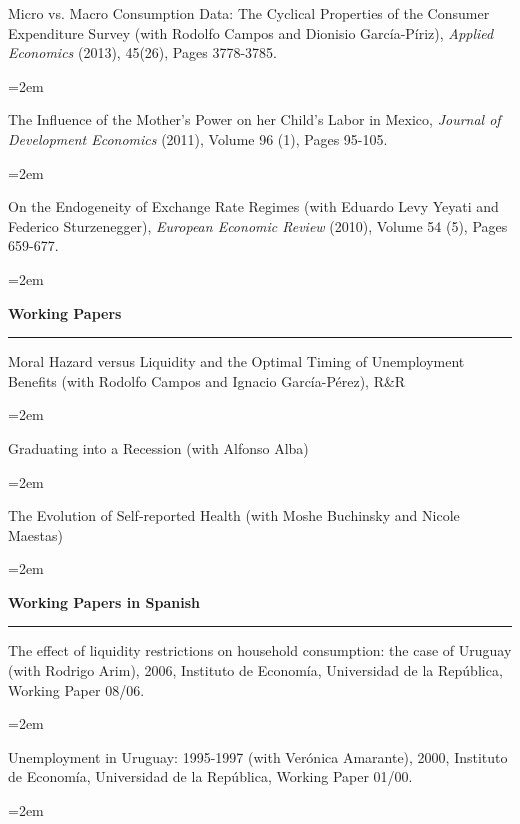 \documentclass[12pt]{article}
\newcommand{\sepspace}{\vspace*{1em}}		%
\newcommand{\NewPart}[1]{ \vspace*{0.4cm} \noindent \large \textbf{#1}
\par \normalsize \normalfont \vspace*{-0.5cm} \noindent\rule{\textwidth}{1.8pt} \vspace*{-0.75cm} }
\newcommand{\EducationEntry}[4]{
		\noindent #1 \hfill      %
		\noindent #2 %
		\noindent \textit{#3} \par        %
		\noindent\hangindent=2em\hangafter=0  #4 %
		\normalsize \par}
\begin{document}
\vspace*{-0.5cm}

\EducationEntry{Micro vs. Macro Consumption Data: The Cyclical Properties of the Consumer Expenditure Survey (with Rodolfo Campos and Dionisio García-Píriz), \textit{Applied Economics} (2013), 45(26), Pages 3778-3785.}{}{}{}

\vspace*{-0.5cm}

\EducationEntry{The Influence of the Mother's Power on her Child's Labor in Mexico, \textit{Journal of Development Economics} (2011), Volume 96 (1), Pages 95-105.}{}{}{}

\vspace*{-0.5cm}

\EducationEntry{On the Endogeneity of Exchange Rate Regimes (with Eduardo Levy Yeyati and Federico Sturzenegger), \textit{European Economic Review} (2010), Volume 54 (5), Pages 659-677.}{}{}{}

\vspace*{-0.5cm}
\NewPart{Working Papers}{}
\vspace*{0.25cm}


\EducationEntry{Moral Hazard versus Liquidity and the Optimal Timing of Unemployment Benefits (with Rodolfo Campos and Ignacio García-Pérez), R\&R}{}{}{}
\vspace*{-0.5cm}

\EducationEntry{Graduating into a Recession (with Alfonso Alba)}{}{}{}

\vspace*{-0.5cm}

\EducationEntry{The Evolution of Self-reported Health (with Moshe Buchinsky and Nicole Maestas)}{}{}{}




\vspace*{-0.25cm}
\NewPart{Working Papers in Spanish}{}

\EducationEntry{The effect of liquidity restrictions on household consumption: the case of Uruguay (with Rodrigo Arim), 2006, Instituto de Economía, Universidad de la República, Working Paper 08/06.}{}{}{}
\vspace*{-0.5cm}
\EducationEntry{Unemployment in Uruguay: 1995-1997 (with Verónica Amarante), 2000, Instituto de Economía, Universidad de la República, Working Paper 01/00.}{}{}{}
\end{document}
